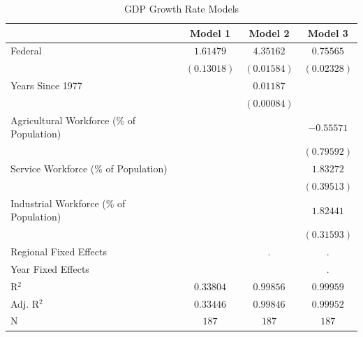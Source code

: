 
\begin{table}
\caption{GDP Growth Rate Models}
\begin{center}
\begin{tabular}{l c c c}
\toprule
 & Model 1 & Model 2 & Model 3 \\
\midrule
Federal                                   & $1.61479$   & $4.35162$   & $0.75565$   \\
                                          & $(0.13018)$ & $(0.01584)$ & $(0.02328)$ \\
Years Since 1977                          &             & $0.01187$   &             \\
                                          &             & $(0.00084)$ &             \\
Agricultural Workforce (\% of Population) &             &             & $-0.55571$  \\
                                          &             &             & $(0.79592)$ \\
Service Workforce (\% of Population)      &             &             & $1.83272$   \\
                                          &             &             & $(0.39513)$ \\
Industrial Workforce (\% of Population)   &             &             & $1.82441$   \\
                                          &             &             & $(0.31593)$ \\
\midrule
Regional Fixed Effects                    &             & .           & .           \\
Year Fixed Effects                        &             &             & .           \\
R$^2$                                     & $0.33804$   & $0.99856$   & $0.99959$   \\
Adj. R$^2$                                & $0.33446$   & $0.99846$   & $0.99952$   \\
N                                         & $187$       & $187$       & $187$       \\
\bottomrule
\end{tabular}
\label{}
\end{center}
\end{table}
